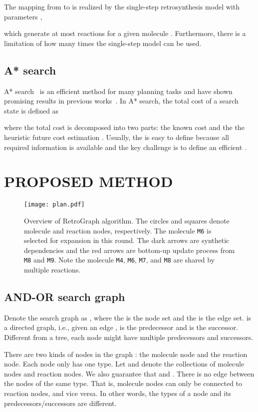 \documentclass[sigconf]{acmart}
\begin{document}
The mapping from  to  is realized by the single-step retrosynthesis model  with parameters ,

which generate at most  reactions for a given molecule .
Furthermore, there is a limitation of how many times the single-step model  can be used.


\subsection{A* search}
A* search~\cite{hart1968} is an efficient method for many planning tasks and have shown promising results in previous works~\cite{Chen2020, Kim2021}.
In A* search, the total cost of a search state  is defined as

where the total cost  is decomposed into two parts: the known cost  and the  the heuristic future cost estimation .
Usually, the  is easy to define because all required information is available and the key challenge is to define an efficient .
\section{PROPOSED METHOD}
\begin{figure*}[!htbp]
    \centering
    \texttt{[image: plan.pdf]}
\caption{Overview of RetroGraph algorithm. The circles and squares denote molecule and reaction nodes, respectively. The molecule \texttt{M6} is selected for expansion in this round. The dark arrows are synthetic dependencies and the red arrows are bottom-up update process from \texttt{M8} and \texttt{M9}. Note the molecule \texttt{M4}, \texttt{M6}, \texttt{M7}, and \texttt{M8} are shared by multiple reactions.}
    \label{fig:system}
\end{figure*}

\subsection{AND-OR search graph}
Denote the search graph as , where the  is the node set and the  is the edge set.  is a directed graph, i.e., given an edge ,  is the predecessor and  is the successor. 
Different from a tree, each node might have multiple predecessors and successors.

There are two kinds of nodes in the graph : the molecule node and the reaction node. Each node only has one type. 
Let  and  denote the collections of molecule nodes and reaction nodes. 
We also guarantee that  and .
There is no edge between the nodes of the same type. That is, molecule nodes can only be connected to reaction nodes, and vice versa. In other words, the types of a node and its predecessors/successors are different.  
\end{document}
